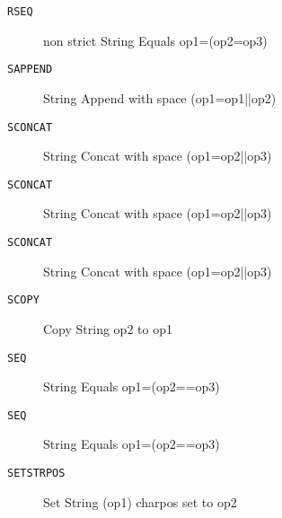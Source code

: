 
\begin{description}
\item[\texttt{RSEQ       }]  non strict String Equals op1=(op2=op3)\\
\end{description}

\begin{description}
\item[\texttt{SAPPEND    }]  String Append with space (op1=op1||op2)\\
\end{description}

\begin{description}
\item[\texttt{SCONCAT    }]  String Concat with space (op1=op2||op3)\\
\end{description}

\begin{description}
\item[\texttt{SCONCAT    }]  String Concat with space (op1=op2||op3)\\
\end{description}

\begin{description}
\item[\texttt{SCONCAT    }]  String Concat with space (op1=op2||op3)\\
\end{description}

\begin{description}
\item[\texttt{SCOPY      }]  Copy String op2 to op1\\
\end{description}

\begin{description}
\item[\texttt{SEQ        }]  String Equals op1=(op2==op3)\\
\end{description}

\begin{description}
\item[\texttt{SEQ        }]  String Equals op1=(op2==op3)\\
\end{description}

\begin{description}
\item[\texttt{SETSTRPOS  }]  Set String (op1) charpos set to op2\\
\end{description}

